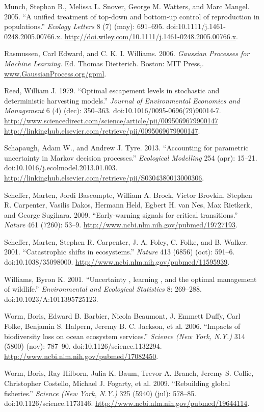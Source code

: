 \documentclass[author-year, review]{elsarticle} %
\begin{document}
Munch, Stephan B., Melissa L. Snover, George M. Watters, and Marc
Mangel. 2005. ``A unified treatment of top-down and bottom-up control of
reproduction in populations.'' \emph{Ecology Letters} 8 (7) (may):
691--695. doi:10.1111/j.1461-0248.2005.00766.x.
\url{http://doi.wiley.com/10.1111/j.1461-0248.2005.00766.x}.

Rasmussen, Carl Edward, and C. K. I. Williams. 2006. \emph{Gaussian
Processes for Machine Learning}. Ed. Thomas Dietterich. Boston: MIT
Press,. \url{www.GaussianProcess.org/gpml}.

Reed, William J. 1979. ``Optimal escapement levels in stochastic and
deterministic harvesting models.'' \emph{Journal of Environmental
Economics and Management} 6 (4) (dec): 350--363.
doi:10.1016/0095-0696(79)90014-7.
\href{http://www.sciencedirect.com/science/article/pii/0095069679900147 http://linkinghub.elsevier.com/retrieve/pii/0095069679900147}{http://www.sciencedirect.com/science/article/pii/0095069679900147
http://linkinghub.elsevier.com/retrieve/pii/0095069679900147}.

Schapaugh, Adam W., and Andrew J. Tyre. 2013. ``Accounting for
parametric uncertainty in Markov decision processes.'' \emph{Ecological
Modelling} 254 (apr): 15--21. doi:10.1016/j.ecolmodel.2013.01.003.
\url{http://linkinghub.elsevier.com/retrieve/pii/S0304380013000306}.

Scheffer, Marten, Jordi Bascompte, William A. Brock, Victor Brovkin,
Stephen R. Carpenter, Vasilis Dakos, Hermann Held, Egbert H. van Nes,
Max Rietkerk, and George Sugihara. 2009. ``Early-warning signals for
critical transitions.'' \emph{Nature} 461 (7260): 53--9.
\url{http://www.ncbi.nlm.nih.gov/pubmed/19727193}.

Scheffer, Marten, Stephen R. Carpenter, J. A. Foley, C. Folke, and B.
Walker. 2001. ``Catastrophic shifts in ecosystems.'' \emph{Nature} 413
(6856) (oct): 591--6. doi:10.1038/35098000.
\url{http://www.ncbi.nlm.nih.gov/pubmed/11595939}.

Williams, Byron K. 2001. ``Uncertainty , learning , and the optimal
management of wildlife.'' \emph{Environmental and Ecological Statistics}
8: 269--288. doi:10.1023/A:1011395725123.

Worm, Boris, Edward B. Barbier, Nicola Beaumont, J. Emmett Duffy, Carl
Folke, Benjamin S. Halpern, Jeremy B. C. Jackson, et al. 2006. ``Impacts
of biodiversity loss on ocean ecosystem services.'' \emph{Science (New
York, N.Y.)} 314 (5800) (nov): 787--90. doi:10.1126/science.1132294.
\url{http://www.ncbi.nlm.nih.gov/pubmed/17082450}.

Worm, Boris, Ray Hilborn, Julia K. Baum, Trevor A. Branch, Jeremy S.
Collie, Christopher Costello, Michael J. Fogarty, et al. 2009.
``Rebuilding global fisheries.'' \emph{Science (New York, N.Y.)} 325
(5940) (jul): 578--85. doi:10.1126/science.1173146.
\url{http://www.ncbi.nlm.nih.gov/pubmed/19644114}.
\end{document}
